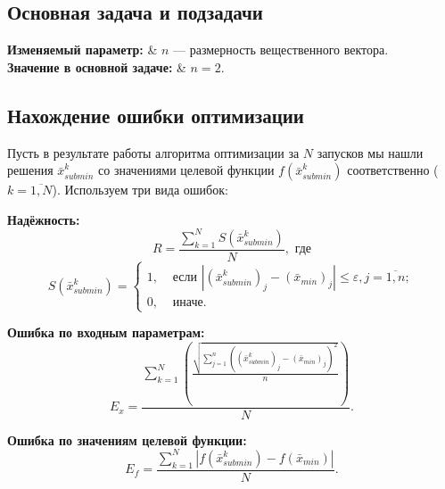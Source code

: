 \documentclass[a4paper,12pt]{article}
\begin{document}
\subsection {Основная задача и подзадачи}

\begin{tabularwide}
\textbf{Изменяемый параметр: } & $n$ --- размерность вещественного вектора. \\
\textbf{Значение в основной задаче:} & $n=2$.\\
\end{tabularwide}

\subsection {Нахождение ошибки оптимизации}

Пусть в результате работы алгоритма оптимизации за $N$ запусков мы нашли решения $\bar{x}_{submin}^k$ со значениями целевой функции $f\left( \bar{x}_{submin}^k\right) $ соответственно ($k=\overline{1,N}$). Используем три вида ошибок:

\textbf{Надёжность: }
\begin{equation*}
R = \dfrac{\sum_{k=1}^{N}S\left( \bar{x}_{submin}^k \right) }{N}, \text{ где}
\end{equation*}
\begin{equation*}
S\left( \bar{x}_{submin}^k \right)=\left\lbrace \begin{aligned} 1,& \text{ если } \left| \left( \bar{x}_{submin}^k \right)_j-\left( \bar{x}_{min} \right)_j\right|\leq\varepsilon, j=\overline{1,n};   \\ 0,& \text{ иначе}. \end{aligned}\right.
\end{equation*}

\textbf{Ошибка по входным параметрам:}
\begin{equation*}
E_x = \dfrac{\sum_{k=1}^{N} \left( \frac{\sqrt{\sum_{j=1}^{n}{\left( \left( \bar{x}_{submin}^k \right)_j-\left( \bar{x}_{min} \right)_j \right)}^2 }}{n} \right)  }{N}.
\end{equation*}

\textbf{Ошибка по значениям целевой функции: }
\begin{equation*}
E_f = \dfrac{\sum_{k=1}^{N} \left| f\left( \bar{x}_{submin}^k \right)-f\left( \bar{x}_{min} \right) \right|  }{N}.
\end{equation*}
\end{document}
